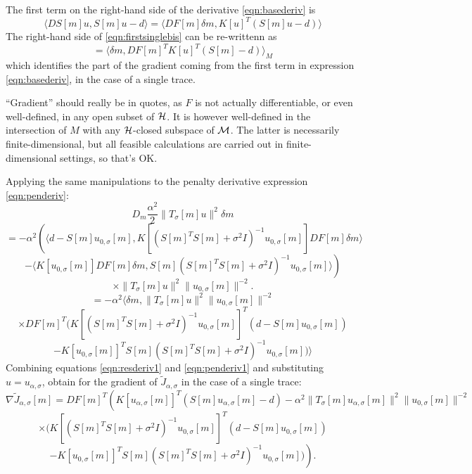 The first term on the right-hand side of the derivative \ref{eqn:basederiv} is
\begin{equation}
  \label{eqn:firstsinglebis}
  \langle DS[m]u, S[m]u-d\rangle = \langle DF[m]\delta m, K[u]^T(S[m]u-d) \rangle
\end{equation}
The right-hand side of \ref{eqn:firstsinglebis} can be re-writtenn as
\begin{equation}
  \label{eqn:resderiv1}
  = \langle \delta m, DF[m]^TK[u]^T(S[m]-d)\rangle_M
\end{equation}
which identifies the part of the gradient coming from the first term in expression \ref{eqn:basederiv}, in the case of a single trace. 

 ``Gradient'' should really be in quotes, as $F$ is not actually differentiable, or even well-defined, in any open subset of ${\cal H}$. It is however well-defined in the intersection of $M$ with any ${\cal H}$-closed subspace of ${\cal M}$. The latter is necessarily finite-dimensional, but all feasible calculations are carried out in finite-dimensional settings, so that's OK.

Applying the same manipulations to the penalty derivative expression \ref{eqn:penderiv}:
\[
  D_m \frac{\alpha^2}{2}\|T_{\sigma}[m] u\|^2\delta m 
\]
\[
  =-\alpha^2\left( \langle d-S[m]u_{0,\sigma}[m], K[(S[m]^TS[m] + \sigma^2I)^{-1}u_{0,\sigma}[m]] DF[m]\delta m \rangle \right.
\]
\[
  \left. - \langle K[u_{0,\sigma}[m] ]DF[m]\delta m, S[m](S[m]^TS[m] + \sigma^2I)^{-1}u_{0,\sigma}[m]\rangle \right)
\]
\[
  \times  \|T_{\sigma}[m]u\|^2\| u_{0,\sigma}[m]\|^{-2}.
\]
\[
  = -\alpha^2 \langle \delta m, \|T_{\sigma}[m]u\|^2\| u_{0,\sigma}[m]\|^{-2}
\]
\[
  \times DF[m]^T(K[(S[m]^TS[m] + \sigma^2I)^{-1}u_{0,\sigma}[m]]^T (d-S[m]u_{0,\sigma}[m]) 
\]
\begin{equation}
  \label{eqn:penderiv1}
  -K[u_{0,\sigma}[m]]^T S[m](S[m]^TS[m] + \sigma^2I)^{-1}u_{0,\sigma}[m]) \rangle
\end{equation}
Combining equations \ref{eqn:resderiv1} and \ref{eqn:penderiv1} and substituting $u = u_{\alpha,\sigma}$, obtain for the gradient of $\tilde{J}_{\alpha,\sigma}$ in the case of a single trace:
\[
  \nabla \tilde{J}_{\alpha,\sigma}[m] = DF[m]^T\left( K[u_{\alpha,\sigma}[m]]^T(S[m]u_{\alpha,\sigma}[m]-d) - \alpha^2 \|T_{\sigma}[m]u_{\alpha,\sigma}[m]\|^2\| u_{0,\sigma}[m]\|^{-2}\right.
\]
\[
  \left. \times( K[(S[m]^TS[m] + \sigma^2I)^{-1}u_{0,\sigma}[m]]^T (d-S[m]u_{0,\sigma}[m]) \right.
\]
\begin{equation}
  \label{eqn:singlegrad}
\left.-K[u_{0,\sigma}[m]]^T S[m](S[m]^TS[m] + \sigma^2I)^{-1}u_{0,\sigma}[m]) \right).
\end{equation}

